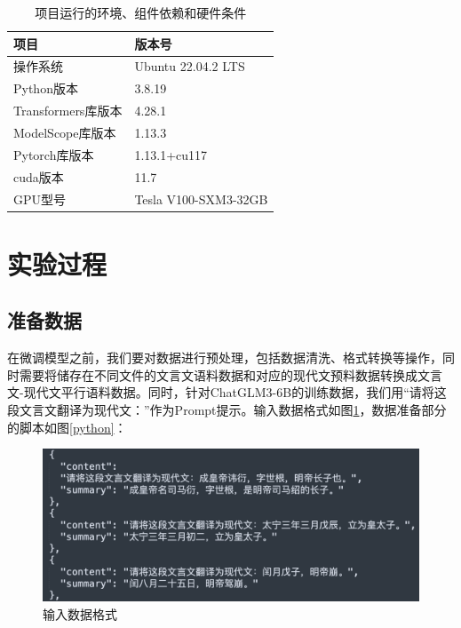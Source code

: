 \documentclass[
    decl-page,  %
    ,fontset = win, %
  ]{njuthesis}
\begin{document}
\begin{table}[h]
\renewcommand\arraystretch{1.5}
\caption{项目运行的环境、组件依赖和硬件条件}
\label{environment}
\begin{tabular}{|l|l|}
\hline
\textbf{项目}     & \textbf{版本号}         \\ \hline
操作系统            & Ubuntu 22.04.2 LTS   \\ \hline
Python版本        & 3.8.19               \\ \hline
Transformers库版本 & 4.28.1               \\ \hline
ModelScope库版本   & 1.13.3               \\ \hline
Pytorch库版本      & 1.13.1+cu117         \\ \hline
cuda版本          & 11.7                 \\ \hline
GPU型号           & Tesla V100-SXM3-32GB \\ \hline
\end{tabular}
\end{table}

\section{实验过程}
\subsection{准备数据}
在微调模型之前，我们要对数据进行预处理，包括数据清洗、格式转换等操作，同时需要将储存在不同文件的文言文语料数据和对应的现代文预料数据转换成文言文-现代文平行语料数据。同时，针对ChatGLM3-6B的训练数据，我们用“请将这段文言文翻译为现代文：”作为Prompt提示。输入数据格式如图\ref{en}，数据准备部分的脚本如图\ref{python}：


\begin{figure}[H]
  \centering
  \includegraphics[width=\textwidth]{image/数据格式.png}
  \caption{输入数据格式}
  \label{en}
\end{figure}
\end{document}
